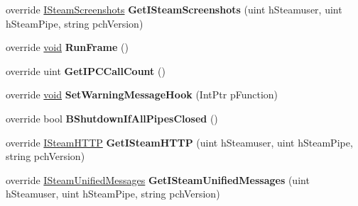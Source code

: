 \begin{DoxyCompactItemize}
\item 
\hypertarget{classValve_1_1Steamworks_1_1CSteamClient_a089e7c5b6c3f52812517a121c00eb542}{}override \hyperlink{classValve_1_1Steamworks_1_1ISteamScreenshots}{I\+Steam\+Screenshots} {\bfseries Get\+I\+Steam\+Screenshots} (uint h\+Steamuser, uint h\+Steam\+Pipe, string pch\+Version)\label{classValve_1_1Steamworks_1_1CSteamClient_a089e7c5b6c3f52812517a121c00eb542}

\item 
\hypertarget{classValve_1_1Steamworks_1_1CSteamClient_a76ab0bb9be6bf703f2b2495b1cbcddae}{}override \hyperlink{SDL__audio_8h_a52835ae37c4bb905b903cbaf5d04b05f}{void} {\bfseries Run\+Frame} ()\label{classValve_1_1Steamworks_1_1CSteamClient_a76ab0bb9be6bf703f2b2495b1cbcddae}

\item 
\hypertarget{classValve_1_1Steamworks_1_1CSteamClient_ab870ca0db394338e55e0e736795bec24}{}override uint {\bfseries Get\+I\+P\+C\+Call\+Count} ()\label{classValve_1_1Steamworks_1_1CSteamClient_ab870ca0db394338e55e0e736795bec24}

\item 
\hypertarget{classValve_1_1Steamworks_1_1CSteamClient_a621014698e2078730aad8f614e09fca5}{}override \hyperlink{SDL__audio_8h_a52835ae37c4bb905b903cbaf5d04b05f}{void} {\bfseries Set\+Warning\+Message\+Hook} (Int\+Ptr p\+Function)\label{classValve_1_1Steamworks_1_1CSteamClient_a621014698e2078730aad8f614e09fca5}

\item 
\hypertarget{classValve_1_1Steamworks_1_1CSteamClient_ac90fae1289516176f60e4e086321854a}{}override bool {\bfseries B\+Shutdown\+If\+All\+Pipes\+Closed} ()\label{classValve_1_1Steamworks_1_1CSteamClient_ac90fae1289516176f60e4e086321854a}

\item 
\hypertarget{classValve_1_1Steamworks_1_1CSteamClient_a9f375a61d5f800ec69ada95882362926}{}override \hyperlink{classValve_1_1Steamworks_1_1ISteamHTTP}{I\+Steam\+H\+T\+T\+P} {\bfseries Get\+I\+Steam\+H\+T\+T\+P} (uint h\+Steamuser, uint h\+Steam\+Pipe, string pch\+Version)\label{classValve_1_1Steamworks_1_1CSteamClient_a9f375a61d5f800ec69ada95882362926}

\item 
\hypertarget{classValve_1_1Steamworks_1_1CSteamClient_aaf57b8f082d90ba5c961544462c360ad}{}override \hyperlink{classValve_1_1Steamworks_1_1ISteamUnifiedMessages}{I\+Steam\+Unified\+Messages} {\bfseries Get\+I\+Steam\+Unified\+Messages} (uint h\+Steamuser, uint h\+Steam\+Pipe, string pch\+Version)\label{classValve_1_1Steamworks_1_1CSteamClient_aaf57b8f082d90ba5c961544462c360ad}


\end{DoxyCompactItemize}
